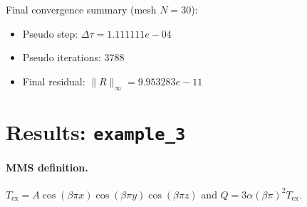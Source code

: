\documentclass[11pt,a4paper]{article}
\begin{document}
\noindent Final convergence summary (mesh $N=30$):
\begin{itemize}
\item Pseudo step: $\Delta\tau=1.111111e-04$
\item Pseudo iterations: 3788
\item Final residual: $\|R\|_\infty=9.953283e-11$
\end{itemize}
\section{Results: \texttt{example\_3}}
\paragraph{MMS definition.}
$T_{\mathrm{ex}} = A\cos(\beta\pi x)\cos(\beta\pi y)\cos(\beta\pi z)$ and $Q = 3\alpha(\beta\pi)^2 T_{\mathrm{ex}}$.
\end{document}
